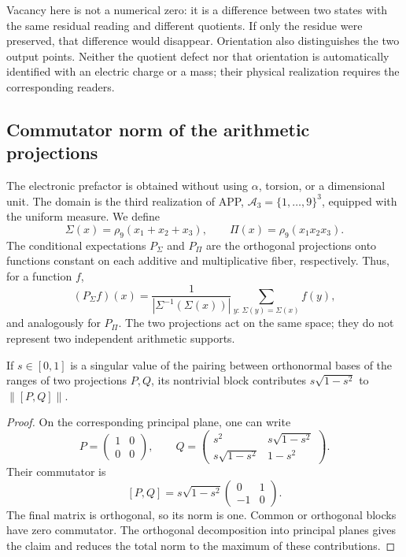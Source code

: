 Vacancy here is not a numerical zero: it is a difference between two
states with the same residual reading and different quotients. If only
the residue were preserved, that difference would disappear.
Orientation also distinguishes the two output points. Neither the quotient
defect nor that orientation is automatically identified with an electric
charge or a mass; their physical realization requires the corresponding
readers.



\subsection{Commutator norm of the arithmetic projections}

The electronic prefactor is obtained without using \(\alpha\), torsion,
or a dimensional unit. The domain is the third realization of APP,
\(\mathcal A_3=\{1,\ldots,9\}^3\), equipped with the uniform measure.
We define
\[
 \Sigma(x)=\rho_9(x_1+x_2+x_3),\qquad
 \Pi(x)=\rho_9(x_1x_2x_3).
\]
The conditional expectations \(P_\Sigma\) and \(P_\Pi\) are the
orthogonal projections onto functions constant on each additive
and multiplicative fiber, respectively. Thus, for a function \(f\),
\[
 (P_\Sigma f)(x)
 =\frac{1}{|\Sigma^{-1}(\Sigma(x))|}
   \sum_{y:\,\Sigma(y)=\Sigma(x)}f(y),
\]
and analogously for \(P_\Pi\). The two projections act on the
same space; they do not represent two independent arithmetic supports.

\begin{lemma}
If \(s\in[0,1]\) is a singular value of the pairing between
orthonormal bases of the ranges of two projections \(P,Q\), its nontrivial
block contributes \(s\sqrt{1-s^2}\) to
\(\|[P,Q]\|\).
\end{lemma}
\begin{proof}
On the corresponding principal plane, one can write
\[
 P=\begin{pmatrix}1&0\\0&0\end{pmatrix},\qquad
 Q=\begin{pmatrix}
 s^2&s\sqrt{1-s^2}\\
 s\sqrt{1-s^2}&1-s^2
 \end{pmatrix}.
\]
Their commutator is
\[
 [P,Q]=s\sqrt{1-s^2}
 \begin{pmatrix}0&1\\-1&0\end{pmatrix}.
\]
The final matrix is orthogonal, so its norm is one. Common
or orthogonal blocks have zero commutator. The orthogonal decomposition
into principal planes gives the claim and reduces the total norm to the maximum
of these contributions.
\end{proof}

